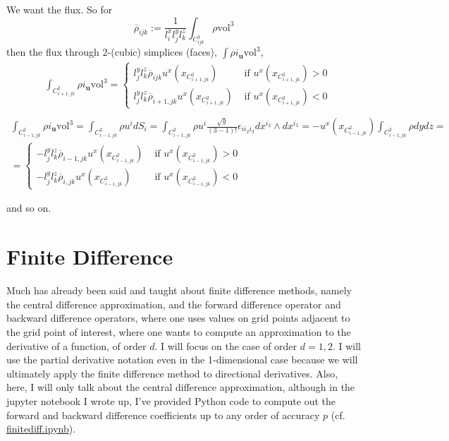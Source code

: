 \documentclass[10pt]{amsart}
\begin{document}
We want the flux.  So for
\[
\overline{\rho}_{ijk} := \frac{1}{l_i^x l_j^yl^z_k} \int_{C^3_{ijk}} \rho \text{vol}^3
\]
then the flux through 2-(cubic) simplices (faces), $\int \rho i_{\mathbf{u}}\text{vol}^3$,
\[
\begin{aligned}
 &  \int_{C^2_{i+1,jk}} \rho i_{\mathbf{u}} \text{vol}^3 = \begin{cases} l_j^yl_k^z \overline{\rho}_{ijk} u^x(x_{C^2_{i+1, jk} } ) & \text{ if } u^x(x_{C^2_{i+1,jk} }) > 0 \\ 
 l_j^y l^z_k \overline{\rho}_{i+1,jk} u^x(x_{C^2_{i+1, jk} } ) & \text{ if } u^x(x_{C^2_{i+1,jk} }) < 0 \end{cases} \\
\end{aligned}
\]
\[
\begin{gathered}
  \int_{C^2_{i-1,jk}} \rho i_{\mathbf{u}} \text{vol}^3 = \int_{C^2_{i-1,jk}} \rho u^i dS_i = \int_{C^2_{i-1,jk}} \rho u^i \frac{ \sqrt{g}}{ (3-1)!} \epsilon_{ii_2i_3} dx^{i_2} \wedge dx^{i_3} = -u^x(x_{C^2_{i-1,jk}}) \int_{C^2_{i-1,jk} } \rho dy dz = \\
  = \begin{cases}
    -l_j^y l^z_k \overline{\rho}_{i-1,jk} u^x(x_{C^2_{i-1,jk}}) & \text{ if } u^x(x_{C^2_{i-1,jk}}) > 0 \\
        -l_j^y l^z_k \overline{\rho}_{i,jk} u^x(x_{C^2_{i-1,jk}}) & \text{ if } u^x(x_{C^2_{i-1,jk}}) < 0 
    \end{cases}
\end{gathered}
\]

and so on.

\section{Finite Difference}

Much has already been said and taught about finite difference methods, namely the central difference approximation, and the forward difference operator and backward difference operators, where one uses values on grid points adjacent to the grid point of interest, where one wants to compute an approximation to the derivative of a function, of order $d$.  I will focus on the case of order $d=1,2$.  I will use the partial derivative notation even in the 1-dimensional case because we will ultimately apply the finite difference method to directional derivatives.  Also, here, I will only talk about the central difference approximation, although in the jupyter notebook I wrote up, I've provided Python code to compute out the forward and backward difference coefficients up to any order of accuracy $p$ (cf. \href{https://nbviewer.jupyter.org/github/ernestyalumni/CompPhys/blob/master/finitediff.ipynb}{finitediff.ipynb}).
\end{document}
